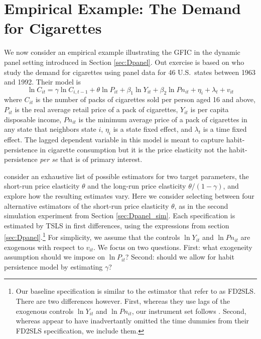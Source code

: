\section{Empirical Example: The Demand for Cigarettes}
\label{sec:cigarettes}
We now consider an empirical example illustrating the GFIC in the dynamic panel setting introduced in Section \ref{sec:Dpanel}.
Out exercise is based on \cite{BaltagiEtAl2000} who study the demand for cigarettes using panel data for 46 U.S.\ states between 1963 and 1992. 
Their model is
\[
  \ln C_{it} =  \gamma \ln C_{i,t-1} + \theta \ln P_{it} + \beta_1 \ln Y_{it} + \beta_2 \ln Pn_{it} + \eta_i + \lambda_t + v_{it}
\] 
where $C_{it}$ is the number of packs of cigarettes sold per person aged 16 and above, $P_{it}$ is the real average retail price of a pack of cigarettes, $Y_{it}$ is per capita disposable income, $Pn_{it}$ is the minimum average price of a pack of cigarettes in any state that neighbors state $i$, $\eta_i$ is a state fixed effect, and $\lambda_t$ is a time fixed effect.
The lagged dependent variable in this model is meant to capture habit-persistence in cigarette consumption but it is the price elasticity not the habit-persistence \emph{per se} that is of primary interest. 

\cite{BaltagiEtAl2000} consider an exhaustive list of possible estimators for two target parameters, the short-run price elasticity $\theta$ and the long-run price elasticity $\theta/(1 - \gamma)$, and explore how the resulting estimates vary.
Here we consider selecting between four alternative estimators of the short-run price elasticity $\theta$, as in the second simulation experiment from Section \ref{sec:Dpanel_sim}.
Each specification is estimated by TSLS in first differences, using the expressions from section \ref{sec:Dpanel}.\footnote{Our baseline specification is similar to the estimator that \cite{BaltagiEtAl2000} refer to as FD2SLS. There are two differences however. First, whereas they use lags of the exogenous controls $\ln Y_{it}$ and $\ln Pn_{it}$, our instrument set follows \cite{AndersonHsiao}. 
Second, whereas \cite{BaltagiEtAl2000} appear to have inadvertantly omitted the time dummies from their FD2SLS specification, we include them.}
For simplicity, we assume that the controls $\ln Y_{it}$ and $\ln Pn_{it}$ are exogenous with respect to $v_{it}$.
We focus on two questions.
First: what exogeneity assumption should we impose on $\ln P_{it}$?
Second: should we allow for habit persistence model by estimating $\gamma$?

